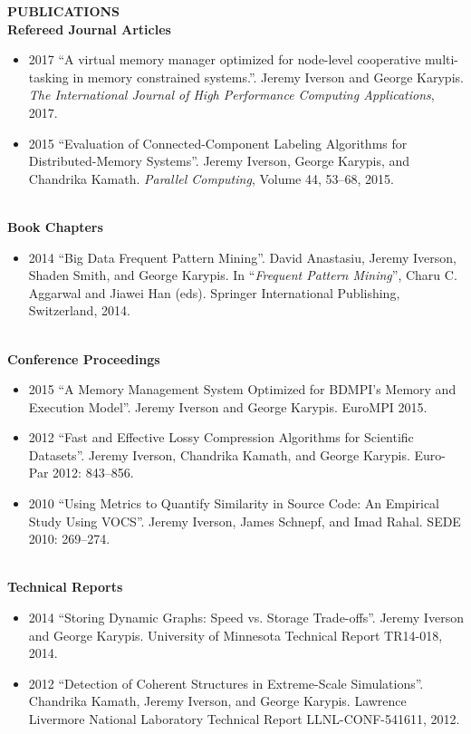 \documentclass[a4paper,12pt]{article}
\newcommand{\lskip}[1]{\hspace*{1em}\\[#1\baselineskip]}
\newenvironment{Itemize}[0]{
  \vspace{-\parskip}\begin{itemize}\interlinepenalty10000
}{
  \end{itemize}
}
\begin{document}
\textbf{PUBLICATIONS}
\lskip{1}
%
\textbf{Refereed Journal Articles}
\begin{Itemize}
  \item[2017] ``A virtual memory manager optimized for node-level cooperative
              multi-tasking in memory constrained systems.''. Jeremy Iverson
              and George Karypis. \textit{The International Journal of High
              Performance Computing Applications}, 2017.
  \item[2015] ``Evaluation of Connected-Component Labeling Algorithms for
              Distributed-Memory Systems''. Jeremy Iverson, George Karypis, and
              Chandrika Kamath. \textit{Parallel Computing}, Volume 44, 53--68,
              2015.
\end{Itemize}
%
\lskip{-2}
%
\textbf{Book Chapters}
\begin{Itemize}
  \item[2014] ``Big Data Frequent Pattern Mining''. David Anastasiu, Jeremy
              Iverson, Shaden Smith, and George Karypis. In ``\textit{Frequent
              Pattern Mining}'', Charu C. Aggarwal and Jiawei Han (eds).
              Springer International Publishing, Switzerland, 2014.
\end{Itemize}
%
\lskip{-2}
%
\textbf{Conference Proceedings}
\begin{Itemize}
  \item[2015] ``A Memory Management System Optimized for BDMPI's Memory and
              Execution Model''. Jeremy Iverson and George Karypis. EuroMPI
              2015.
  \item[2012] ``Fast and Effective Lossy Compression Algorithms for Scientific
              Datasets''. Jeremy Iverson, Chandrika Kamath, and George Karypis.
              Euro-Par 2012: 843--856.
  \item[2010] ``Using Metrics to Quantify Similarity in Source Code: An
              Empirical Study Using VOCS''. Jeremy Iverson, James Schnepf, and
              Imad Rahal. SEDE 2010: 269--274.
\end{Itemize}
%
\lskip{-2}
%
\textbf{Technical Reports}
\begin{Itemize}
  \item[2014] ``Storing Dynamic Graphs: Speed vs. Storage Trade-offs''. Jeremy
              Iverson and George Karypis. University of Minnesota Technical
              Report TR14-018, 2014. %
  \item[2012] ``Detection of Coherent Structures in Extreme-Scale
              Simulations''. Chandrika Kamath, Jeremy Iverson, and George
              Karypis. Lawrence Livermore National Laboratory Technical Report
              LLNL-CONF-541611, 2012.
\end{Itemize}
\end{document}
